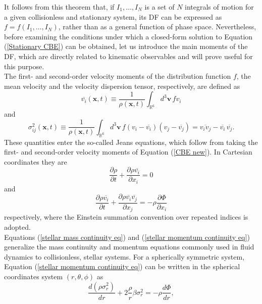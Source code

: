 \documentclass[12pt,twoside,openany]{book}
\begin{document}
\noindent It follows from this theorem that, if $I_1,\ldots,I_N$ is a set of $N$ integrals of motion for a given collisionless and stationary system, its DF can be expressed as $f=f(I_1,\ldots,I_N)$, rather than as a general function of phase space. Nevertheless,  before examining the conditions under which a closed-form solution to Equation (\ref{Stationary CBE}) can be obtained, let us introduce the main moments of the DF, which are directly related to kinematic observables and will prove useful for this purpose.\\The first- and second-order velocity moments of the distribution function $f$, the mean velocity and the velocity dispersion tensor, respectively, are defined as
\begin{equation}\label{mean velocity of DF}
    \overline{v_i}(\mathbf{x},t)\equiv
    \frac{1}{\rho(\mathbf{x},t)}\int_{\mathbb{R}^6} d^3 \mathbf{v}\,f v_i
\end{equation}
and
\begin{equation}\label{velocity-dispersion of DF}
    \sigma_{ij}^2(\mathbf{x},t)\equiv
    \frac{1}{\rho(\mathbf{x},t)}\int_{\mathbb{R}^6} d^3 \mathbf{v}\,
    f (v_i-\overline{v_i})(v_j-\overline{v_j})=\overline{v_iv_j}-
    \overline{v_i}\,\overline{v_j}.
\end{equation}
These quantities enter the so-called Jeans equations, which follow from taking the first- and second-order velocity moments of Equation (\ref{CBE new}). In Cartesian coordinates they are
\begin{equation}
\label{stellar mass continuity eq}
 \frac{\partial \rho}{\partial t}+\frac{\partial \rho \overline{v_i}}{\partial x_i}=0
\end{equation}
and
\begin{equation}
\label{stellar momentum continuity eq}
 \frac{\partial \rho\overline{v_i}}{\partial t}+\frac{\partial \rho \overline{v_i}\overline{v_j}}{\partial x_j}=-\rho\frac{\partial \Phi}{\partial x_i}
\end{equation}
respectively, where the Einstein summation convention over repeated indices is adopted.\\Equations (\ref{stellar mass continuity eq}) and (\ref{stellar momentum continuity eq}) generalize the mass continuity and momentum equations commonly used in fluid dynamics to collisionless, stellar systems. For a spherically symmetric system, Equation (\ref{stellar momentum continuity eq}) can be written in the spherical coordinates system $(r,\theta,\phi)$  as
\begin{equation}
\label{jeans eq}
\frac{d(\rho \sigma_r^2)}{dr}
+2\frac{\rho}{r}\beta \sigma_r^2
=-\rho\frac{d\Phi}{dr},
\end{equation}
\end{document}
